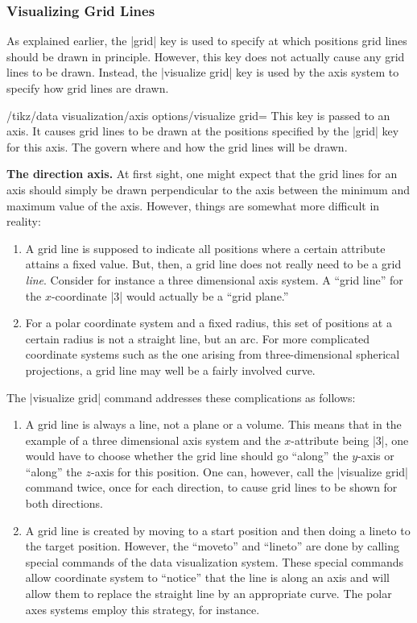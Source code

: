 \subsubsection{Visualizing Grid Lines}

\label{section-dv-visualize-gridlines}

As explained earlier, the |grid| key is used to specify at which
positions grid lines should be drawn in principle. However, this key
does not actually cause any grid lines to be drawn. Instead, the
|visualize grid| key is used by the axis system to specify how grid
lines are drawn.

\begin{key}{/tikz/data visualization/axis options/visualize grid=}
  This key is passed to an axis. It causes grid lines to be drawn at
  the positions specified by the |grid| key for this axis. The
   govern where and how the grid lines will be drawn.
  
  \medskip
  \textbf{The direction axis.}
  At first sight, one might expect that the grid lines for an axis
  should simply be drawn perpendicular to the axis between the minimum
  and maximum value of the axis. However, things are somewhat more
  difficult in reality:
  \begin{enumerate}
  \item A grid line is supposed to indicate all positions where a
    certain attribute attains a fixed value. But, then, a grid line
    does not really need to be a grid \emph{line}. Consider for
    instance a three dimensional axis system. A ``grid line'' for the
    $x$-coordinate |3| would actually     be a ``grid plane.''
  \item For a polar coordinate  system and a fixed radius, this set of
    positions at a certain radius is not a straight line, but an
    arc. For more complicated coordinate systems such as the one
    arising from three-dimensional spherical projections, a grid line
    may well be a fairly involved curve. 
  \end{enumerate}
  The |visualize grid| command addresses these complications as
  follows:
  \begin{enumerate}
  \item A grid line is always a line, not a plane or a volume. This
    means that in the example of a three dimensional axis system and
    the $x$-attribute being |3|, one would have to choose whether the
    grid line should go ``along'' the $y$-axis or ``along'' the
    $z$-axis for this position. One can, however, call the
    |visualize grid| command twice, once for each direction, to cause
    grid lines to be shown for both directions.
  \item A grid line is created by moving to a start position and then
    doing a lineto to the target position. However, the ``moveto''
    and ``lineto'' are done by calling special commands of the data
    visualization system. These special commands allow coordinate
    system to ``notice'' that the line is along an axis and will allow
    them to replace the straight line by an appropriate curve. The
    polar axes systems employ this strategy, for instance.
  \end{enumerate}
  

\end{key}
